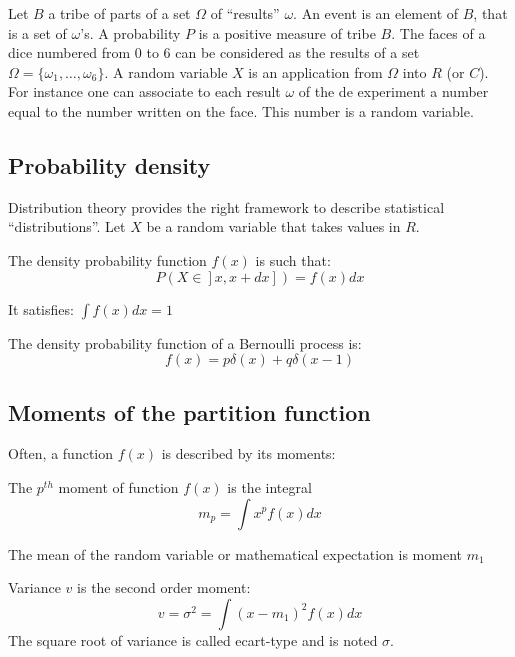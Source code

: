 \documentclass[12pt]{book}
\begin{document}
Let $B$ a tribe of parts of a set $\Omega$ of ``results'' $\omega$. An
event is an element of $B$, that is a set of $\omega$'s. A probability
$P$ is a positive measure of tribe $B$.
The faces of a dice numbered from 0 to 6 can be considered as the results
of a set $\Omega=\{\omega_1,\dots,\omega_6\}$.
A random variable $X$ is an application from $\Omega$ into $R$ (or
$C$).
For instance one can associate to each result $\omega$ of the de
experiment a number equal to the number written on the face. This
number is a random variable.

\subsection{Probability density}
Distribution theory provides the right framework to describe
statistical ``distributions''. 
Let $X$ be a random variable that takes values in $R$. 
\begin{defn}
The density probability function $f(x)$ is such that:
\begin{equation}
P(X\in \mathrel{]}x,x+dx\mathrel{]})=f(x)dx
\end{equation}
\end{defn}
It satisfies:
$\int f(x)dx=1$
\begin{exmp}
The density probability function of a Bernoulli process is:
\begin{equation}
f(x)=p\delta (x)+q\delta (x-1)
\end{equation}
\end{exmp}
\subsection{Moments of the partition function}
Often, a function $f(x)$ is described by its moments:
\begin{defn}
The $p^{th}$ moment of function $f(x)$ is the integral 
\begin{equation}
m_p=\int x^pf(x)dx
\end{equation}
\end{defn}
\begin{defn}
The mean of the random variable or mathematical expectation is moment $m_1$
\end{defn}
\begin{defn}
Variance $v$ is the second order moment:
\begin{equation}
v=\sigma^2=\int (x-m_1)^2f(x)dx
\end{equation}
The square root of variance is called ecart-type and is noted
$\sigma$. 
\end{defn}
\end{document}
